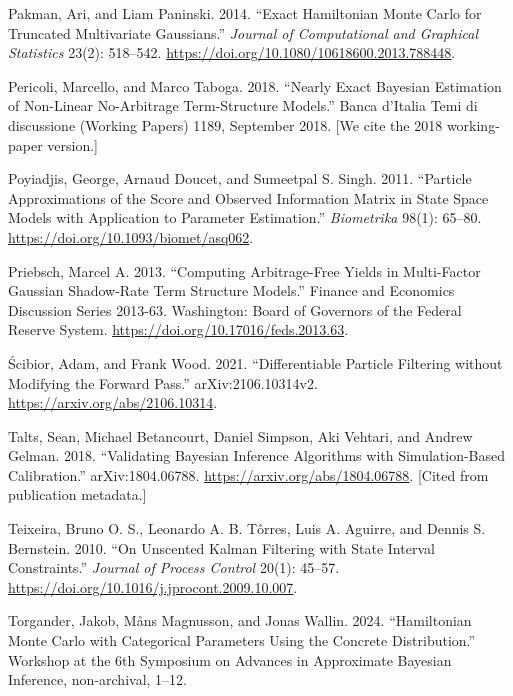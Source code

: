 \documentclass[11pt]{article}
\begin{document}
\begin{list}{}{\setlength{\leftmargin}{2em}\setlength{\itemindent}{-2em}\setlength{\itemsep}{2pt}\setlength{\parsep}{0pt}}
\item Pakman, Ari, and Liam Paninski. 2014. ``Exact Hamiltonian Monte Carlo for Truncated Multivariate Gaussians.'' \emph{Journal of Computational and Graphical Statistics} 23(2): 518--542. \url{https://doi.org/10.1080/10618600.2013.788448}.

\item Pericoli, Marcello, and Marco Taboga. 2018. ``Nearly Exact Bayesian Estimation of Non-Linear No-Arbitrage Term-Structure Models.'' Banca d'Italia Temi di discussione (Working Papers) 1189, September 2018. [We cite the 2018 working-paper version.]

\item Poyiadjis, George, Arnaud Doucet, and Sumeetpal S. Singh. 2011. ``Particle Approximations of the Score and Observed Information Matrix in State Space Models with Application to Parameter Estimation.'' \emph{Biometrika} 98(1): 65--80. \url{https://doi.org/10.1093/biomet/asq062}.

\item Priebsch, Marcel A. 2013. ``Computing Arbitrage-Free Yields in Multi-Factor Gaussian Shadow-Rate Term Structure Models.'' Finance and Economics Discussion Series 2013-63. Washington: Board of Governors of the Federal Reserve System. \url{https://doi.org/10.17016/feds.2013.63}.

\item \'Scibior, Adam, and Frank Wood. 2021. ``Differentiable Particle Filtering without Modifying the Forward Pass.'' arXiv:2106.10314v2. \url{https://arxiv.org/abs/2106.10314}.

\item Talts, Sean, Michael Betancourt, Daniel Simpson, Aki Vehtari, and Andrew Gelman. 2018. ``Validating Bayesian Inference Algorithms with Simulation-Based Calibration.'' arXiv:1804.06788. \url{https://arxiv.org/abs/1804.06788}. [Cited from publication metadata.]

\item Teixeira, Bruno O. S., Leonardo A. B. T\^orres, Luis A. Aguirre, and Dennis S. Bernstein. 2010. ``On Unscented Kalman Filtering with State Interval Constraints.'' \emph{Journal of Process Control} 20(1): 45--57. \url{https://doi.org/10.1016/j.jprocont.2009.10.007}.

\item Torgander, Jakob, M\aa{}ns Magnusson, and Jonas Wallin. 2024. ``Hamiltonian Monte Carlo with Categorical Parameters Using the Concrete Distribution.'' Workshop at the 6th Symposium on Advances in Approximate Bayesian Inference, non-archival, 1--12.


\end{list}
\end{document}
